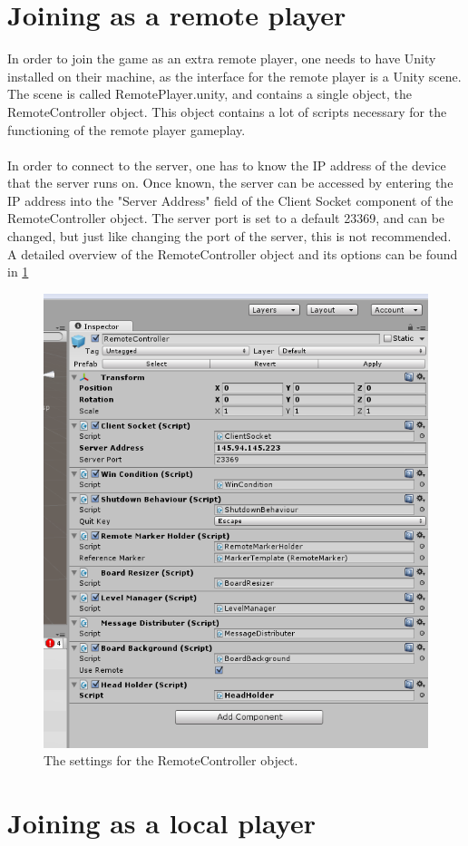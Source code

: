 \documentclass[]{report}
\begin{document}
\section*{Joining as a remote player}
In order to join the game as an extra remote player, one needs to have Unity
installed on their machine, as the interface for the remote player is a Unity
scene. The scene is called RemotePlayer.unity, and contains a single object,
the RemoteController object. This object contains a lot of scripts necessary
for the functioning of the remote player gameplay.\\
\\
In order to connect to the server, one has to know the IP address of the
device that the server runs on. Once known, the server can be accessed by
entering the IP address into the "Server Address" field of the Client Socket
component of the RemoteController object. The server port is set to a default
23369, and can be changed, but just like changing the port of the server,
this is not recommended. A detailed overview of the RemoteController object
and its options can be found in \ref{fig:remotecontroller}
\begin{figure}[!ht]
	\centering
	\includegraphics[scale = 0.6]{RemoteController}
	\caption{The settings for the RemoteController object.}
	\label{fig:remotecontroller}
\end{figure}
\section*{Joining as a local player}
\end{document}
